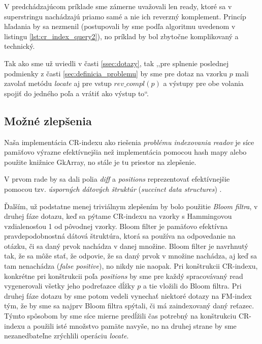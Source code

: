 \begin{pozn}
V predchádzajúcom príklade sme zámerne uvažovali len ready, ktoré sa v superstringu nachádzajú priamo samé a nie ich reverzný komplement. Princíp hľadania by sa nezmenil (postupovali by sme podľa algoritmu uvedenom v listingu \ref{lst:cr_index_query2}), no príklad by bol zbytočne komplikovaný a technický.
\end{pozn}

\begin{pozn}
Tak ako sme už uviedli v časti \ref{ssec:dotazy}, tak ,,pre splnenie poslednej podmienky z časti \ref{sec:definicia_problemu} by sme pre dotaz na vzorku $p$ mali zavolať metódu \emph{locate} aj pre vstup $rev\_compl(p)$ a výstupy pre obe volania spojiť do jedného poľa a vrátiť ako výstup to``.\end{pozn}

\subsection{Možné zlepšenia}
Naša implementácia CR-indexu ako riešenia \emph{problému indexovania readov} je síce pamäťovo výrazne efektívnejšia než implementácia pomocou hash mapy alebo použite knižnice GkArray, no stále je tu priestor na zlepšenie.

V prvom rade by sa dali polia \emph{diff} a \emph{positions} reprezentovať efektívnejšie pomocou tzv. \emph{úsporných dátových štruktúr} (\emph{succinct data structures}) \cite{GBMP14}.

Ďalším, už podstatne menej triviálnym zlepšením by bolo použitie \emph{Bloom filtra}, v druhej fáze dotazu, keď sa pýtame CR-indexu na vzorky s Hammingovou vzdialenosťou 1 od pôvodnej vzorky. Bloom filter je pamäťovo efektívna pravdepodobnostná dátová štruktúra, ktorá sa používa na odpovedanie na otázku, či sa daný prvok nachádza v danej množine. Bloom filter je navrhnutý tak, že sa môže stať, že odpovie, že sa daný prvok v množine nachádza, aj keď sa tam nenachádza (\emph{false positive}), no nikdy nie naopak. Pri konštrukcii CR-indexu, konkrétne pri konštrukcii poľa \emph{positions} by sme pre každý spracovávaný read vygenerovali všetky jeho podreťazce dĺžky $p$ a tie vložili do Bloom filtra. Pri druhej fáze dotazu by sme potom vedeli vynechať niektoré dotazy na FM-index tým, že by sme sa najprv Bloom filtra spýtali, či má zaindexovaný daný reťazec. Týmto spôsobom by sme síce mierne predĺžili čas potrebný na konštrukciu CR-indexu a použili isté množstvo pamäte navyše, no na druhej strane by sme nezanedbateľne zrýchlili operáciu \emph{locate}.
